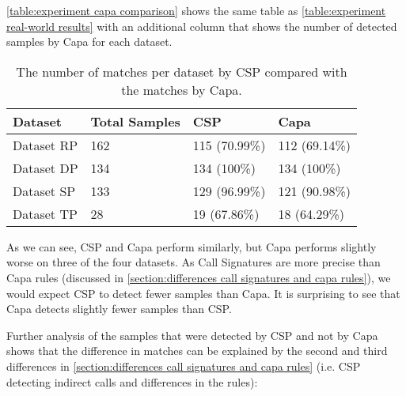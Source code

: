 \medskip

\autoref{table:experiment capa comparison} shows the same table as \autoref{table:experiment real-world results} with an additional column that shows the number of detected samples by Capa for each dataset.

\begin{table}[ht]
  \centering
  \begin{tabular}{l|lll}
      \hline
      Dataset     & Total Samples & CSP           & Capa          \\ \hline
      Dataset RP  & 162           & 115 (70.99\%) & 112 (69.14\%) \\ \hline
      Dataset DP  & 134           & 134 (100\%)   & 134 (100\%)   \\ \hline
      Dataset SP  & 133           & 129 (96.99\%) & 121 (90.98\%) \\ \hline
      Dataset TP  & 28            & 19  (67.86\%) & 18  (64.29\%) \\ \hline
  \end{tabular}
  \caption{The number of matches per dataset by CSP compared with the matches by Capa.}
  \label{table:experiment capa comparison}
\end{table}

As we can see, CSP and Capa perform similarly, but Capa performs slightly worse on three of the four datasets. As Call Signatures are more precise than Capa rules (discussed in \autoref{section:differences call signatures and capa rules}), we would expect CSP to detect fewer samples than Capa. It is surprising to see that Capa detects slightly fewer samples than CSP.

\medskip

Further analysis of the samples that were detected by CSP and not by Capa shows that the difference in matches can be explained by the second and third differences in \autoref{section:differences call signatures and capa rules} (i.e. CSP detecting indirect calls and differences in the rules):

